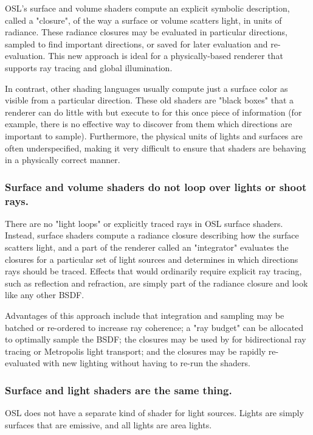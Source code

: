 \documentclass[11pt,letterpaper]{book}
\begin{document}
  OSL's surface and volume shaders compute an explicit symbolic
  description, called a "closure", of the way a surface or volume
  scatters light, in units of radiance.  These radiance closures may be
  evaluated in particular directions, sampled to find important
  directions, or saved for later evaluation and re-evaluation.
  This new approach is ideal for a physically-based renderer that
  supports ray tracing and global illumination.

  In contrast, other shading languages usually compute just a surface
  color as visible from a particular direction.  These old shaders are
  "black boxes" that a renderer can do little with but execute to for
  this once piece of information (for example, there is no effective way
  to discover from them which directions are important to sample).
  Furthermore, the physical units of lights and surfaces are often
  underspecified, making it very difficult to ensure that shaders are
  behaving in a physically correct manner.

\subsubsection*{Surface and volume shaders do not loop over lights or shoot rays.}

  There are no "light loops" or explicitly traced rays in OSL surface
  shaders.  Instead, surface shaders compute a radiance closure
  describing how the surface scatters light, and a part of the renderer
  called an "integrator" evaluates the closures for a particular set of
  light sources and determines in which directions rays should be
  traced.  Effects that would ordinarily require explicit ray tracing,
  such as reflection and refraction, are simply part of the radiance
  closure and look like any other BSDF.

  Advantages of this approach include that integration and sampling may
  be batched or re-ordered to increase ray coherence; a "ray budget" can
  be allocated to optimally sample the BSDF; the closures may be used by
  for bidirectional ray tracing or Metropolis light transport; and the
  closures may be rapidly re-evaluated with new lighting without having
  to re-run the shaders.

\subsubsection*{Surface and light shaders are the same thing.}

  OSL does not have a separate kind of shader for light sources.  Lights
  are simply surfaces that are emissive, and all lights are area lights.
\end{document}
